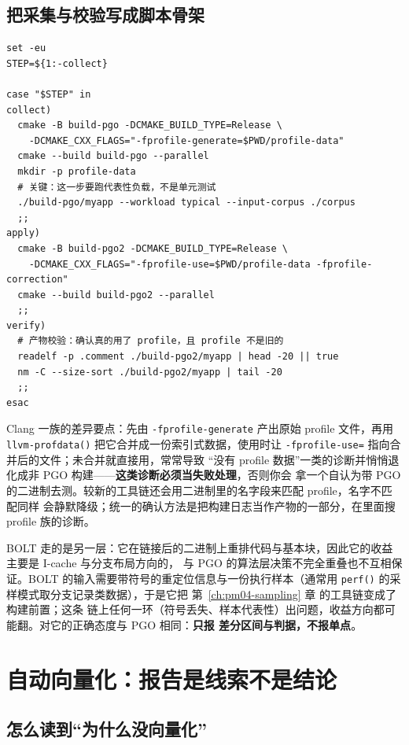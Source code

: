 \documentclass[12pt,a4paper,fontset=fandol]{ctexbook}
\newcommand{\Fn}[1]{\texttt{#1()}}
\newcommand{\Tp}[1]{\texttt{#1}}
\begin{document}
\subsection{把采集与校验写成脚本骨架}

\begin{lstlisting}[style=shellstyle,title={GCC 风格 PGO 两轮流程骨架（选项名以你的版本为准）},label={lst:pm10-pgo}]
set -eu
STEP=${1:-collect}

case "$STEP" in
collect)
  cmake -B build-pgo -DCMAKE_BUILD_TYPE=Release \
    -DCMAKE_CXX_FLAGS="-fprofile-generate=$PWD/profile-data"
  cmake --build build-pgo --parallel
  mkdir -p profile-data
  # 关键：这一步要跑代表性负载，不是单元测试
  ./build-pgo/myapp --workload typical --input-corpus ./corpus
  ;;
apply)
  cmake -B build-pgo2 -DCMAKE_BUILD_TYPE=Release \
    -DCMAKE_CXX_FLAGS="-fprofile-use=$PWD/profile-data -fprofile-correction"
  cmake --build build-pgo2 --parallel
  ;;
verify)
  # 产物校验：确认真的用了 profile，且 profile 不是旧的
  readelf -p .comment ./build-pgo2/myapp | head -20 || true
  nm -C --size-sort ./build-pgo2/myapp | tail -20
  ;;
esac
\end{lstlisting}

Clang 一族的差异要点：先由 \Tp{-fprofile-generate} 产出原始 profile 文件，再用 \Fn{llvm-profdata}
把它合并成一份索引式数据，使用时让 \Tp{-fprofile-use=} 指向合并后的文件；未合并就直接用，常常导致
``没有 profile 数据''一类的诊断并悄悄退化成非 PGO 构建——\textbf{这类诊断必须当失败处理}，否则你会
拿一个自认为带 PGO 的二进制去测。较新的工具链还会用二进制里的名字段来匹配 profile，名字不匹配同样
会静默降级；统一的确认方法是把构建日志当作产物的一部分，在里面搜 profile 族的诊断。

BOLT 走的是另一层：它在链接后的二进制上重排代码与基本块，因此它的收益主要是 I-cache 与分支布局方向的，
与 PGO 的算法层决策不完全重叠也不互相保证。BOLT 的输入需要带符号的重定位信息与一份执行样本（通常用
\Fn{perf} 的采样模式取分支记录类数据），于是它把 第~\ref{ch:pm04-sampling} 章 的工具链变成了构建前置；这条
链上任何一环（符号丢失、样本代表性）出问题，收益方向都可能翻。对它的正确态度与 PGO 相同：\textbf{只报
差分区间与判据，不报单点}。

\section{自动向量化：报告是线索不是结论}
\label{sec:pm10-vec}

\subsection{怎么读到``为什么没向量化''}
\end{document}
